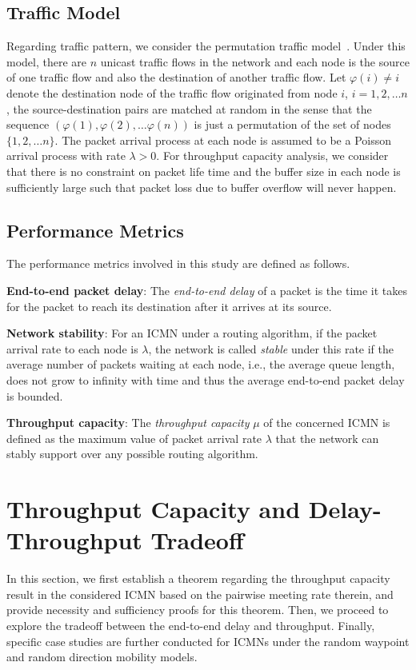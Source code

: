 \documentclass[twocolumn, 10pt]{svjour3}         \smartqed  \usepackage{graphicx}
\begin{document}
\subsection{Traffic Model}

Regarding traffic pattern, we consider the permutation traffic model~\cite{ciullo2011impact}.
Under this model, there are $n$ unicast traffic flows in the network and each node is the source of one traffic flow and also the destination of another traffic flow. 
Let $\varphi(i) \neq i$ denote the destination node of the traffic flow originated from node $i$, $i = 1,2,\ldots  n$, the source-destination pairs are matched at random in the sense that the sequence $(\varphi(1), \varphi(2),\ldots \varphi(n))$ is just a  permutation of the set of nodes $\{1, 2, \ldots n\}$.
The packet arrival process at each node is assumed to be a Poisson arrival process  with rate $\lambda > 0$.
For throughput capacity analysis, we consider that there is no constraint on packet life time and the buffer size in each node is sufficiently large such that packet loss due to buffer overflow will never happen.

\subsection{Performance Metrics}\label{subsec:definition}
The performance metrics involved in this study are defined as follows.


\textbf{End-to-end packet delay}: The \emph{end-to-end delay} of a packet is the time it takes for the packet to reach its destination after it arrives at its source.
 
\textbf{Network stability}: For an ICMN under a routing algorithm, if the packet arrival rate  to each node is $\lambda$, the network is called \emph{stable} under this rate if the average number of packets waiting at each node, i.e., the average queue length, does not grow to infinity with time and thus the average end-to-end packet delay is bounded.

\textbf{Throughput capacity}: The \emph{throughput capacity} $\mu$ of the concerned ICMN is defined as the maximum value of packet arrival rate $ \lambda$  that the network can stably support over any possible routing algorithm.




\section{Throughput Capacity and Delay-Throughput Tradeoff}\label{sec:capacity}
In this section, we first establish a theorem regarding the throughput capacity result in the considered ICMN based on the pairwise meeting rate therein, and provide necessity and sufficiency proofs for this theorem.
Then, we proceed to explore the tradeoff between the end-to-end delay  and throughput.
Finally,  specific case studies are further conducted  for ICMNs under the random waypoint and random direction mobility models.
\end{document}
